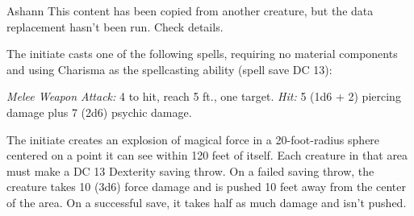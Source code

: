 \documentclass[10pt,a4paper,twoside,bg=print,twocolumn,openany,nodeprecatedcode]{dndbook}
\begin{document}
\begin{DndMonster}[float=t]{Ashann}
\DndMonsterBasics[
armor-class = {12},
hit-points = {\DndDice{12d8 + 12}},
speed = {30 ft.}
]
\DndMonsterAbilityScores[
 str = 10,
 dex = 14,
 con = 12,
 int = 14,
 wis = 10,
 cha = 16
]
\DndMonsterDetails[
skills = {Arcana +6, Deception +5, History +4, Perception +2},
languages = {Common plus one other language},
challenge = 2,
]
This content has been copied from another creature, but the data replacement hasn't been run. Check details.

The initiate casts one of the following spells, requiring no material components and using Charisma as the spellcasting ability (spell save DC 13):
\begin{DndMonsterSpells}
\end{DndMonsterSpells}
\textsl{Melee Weapon Attack:} 4 to hit, reach 5 ft., one target. \textsl{Hit:} 5 (1d6 + 2) piercing damage plus 7 (2d6) psychic damage.

The initiate creates an explosion of magical force in a 20-foot-radius sphere centered on a point it can see within 120 feet of itself. Each creature in that area must make a DC 13 Dexterity saving throw. On a failed saving throw, the creature takes 10 (3d6) force damage and is pushed 10 feet away from the center of the area. On a successful save, it takes half as much damage and isn't pushed.

\end{DndMonster}
\end{document}
